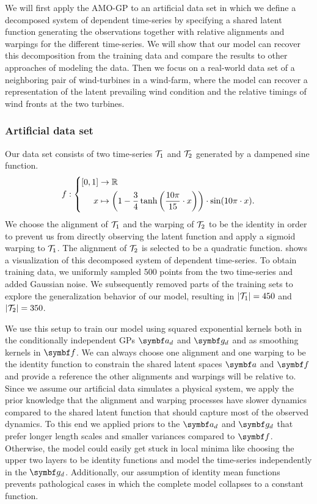 We will first apply the AMO-GP to an artificial data set in which we define a decomposed system of dependent time-series by specifying a shared latent function generating the observations together with relative alignments and warpings for the different time-series.
We will show that our model can recover this decomposition from the training data and compare the results to other approaches of modeling the data.
Then we focus on a real-world data set of a neighboring pair of wind-turbines in a wind-farm, where the model can recover a representation of the latent prevailing wind condition and the relative timings of wind fronts at the two turbines.

\subsubsection{Artificial data set}
Our data set consists of two time-series $\mathcal{T}_1$ and $\mathcal{T}_2$ generated by a dampened sine function.
\begin{align}
    f : \left\{ \begin{aligned}
        [0, 1] & \to \Rb                                                                                                          \\
        x      & \mapsto \left( 1 - \frac{3}{4} \tanh \left( \frac{10\pi}{15} \cdot x \right) \right) \cdot \sin (10\pi \cdot x).
    \end{aligned}\right.
\end{align}
We choose the alignment of $\mathcal{T}_1$ and the warping of $\mathcal{T}_2$ to be the identity in order to prevent us from directly observing the latent function and apply a sigmoid warping to $\mathcal{T}_1$.
The alignment of $\mathcal{T}_2$ is selected to be a quadratic function.
 shows a visualization of this decomposed system of dependent time-series.
To obtain training data, we uniformly sampled 500 points from the two time-series and added Gaussian noise.
We subsequently removed parts of the training sets to explore the generalization behavior of our model, resulting in $\vert\mathcal{T}_1\vert= 450$ and $\vert\mathcal{T}_2\vert = 350$.

We use this setup to train our model using squared exponential kernels both in the conditionally independent GPs $\rv{a}_d$ and $\rv{g}_d$ and as smoothing kernels in $\rv{f}$.
We can always choose one alignment and one warping to be the identity function to constrain the shared latent spaces $\rv{a}$ and $\rv{f}$ and provide a reference the other alignments and warpings will be relative to.
Since we assume our artificial data simulates a physical system, we apply the prior knowledge that the alignment and warping processes have slower dynamics compared to the shared latent function that should capture most of the observed dynamics.
To this end we applied priors to the $\rv{a}_d$ and $\rv{g}_d$ that prefer longer length scales and smaller variances compared to $\rv{f}$.
Otherwise, the model could easily get stuck in local minima like choosing the upper two layers to be identity functions and model the time-series independently in the $\rv{g}_d$.
Additionally, our assumption of identity mean functions prevents pathological cases in which the complete model collapses to a constant function.

